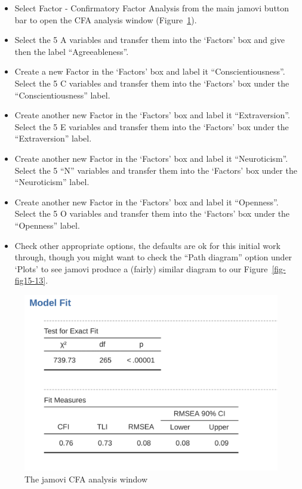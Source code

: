 \documentclass[
  a4paper,
]{book}
\begin{document}
\begin{itemize}
\item
  Select Factor - Confirmatory Factor Analysis from the main jamovi
  button bar to open the CFA analysis window
  (Figure~\ref{fig-fig15-14}).
\item
  Select the 5 A variables and transfer them into the `Factors' box and
  give then the label ``Agreeableness''.
\item
  Create a new Factor in the `Factors' box and label it
  ``Conscientiousness''. Select the 5 C variables and transfer them into
  the `Factors' box under the ``Conscientiousness'' label.
\item
  Create another new Factor in the `Factors' box and label it
  ``Extraversion''. Select the 5 E variables and transfer them into the
  `Factors' box under the ``Extraversion'' label.
\item
  Create another new Factor in the `Factors' box and label it
  ``Neuroticism''. Select the 5 ``N'' variables and transfer them into
  the `Factors' box under the ``Neuroticism'' label.
\item
  Create another new Factor in the `Factors' box and label it
  ``Openness''. Select the 5 O variables and transfer them into the
  `Factors' box under the ``Openness'' label.
\item
  Check other appropriate options, the defaults are ok for this initial
  work through, though you might want to check the ``Path diagram''
  option under `Plots' to see jamovi produce a (fairly) similar diagram
  to our Figure~\ref{fig-fig15-13}.
\end{itemize}

\begin{figure}

\includegraphics[width=1\textwidth,height=\textheight]{images/fig15-14.png} \hfill{}

\caption{\label{fig-fig15-14}The jamovi CFA analysis window}

\end{figure}
\end{document}
